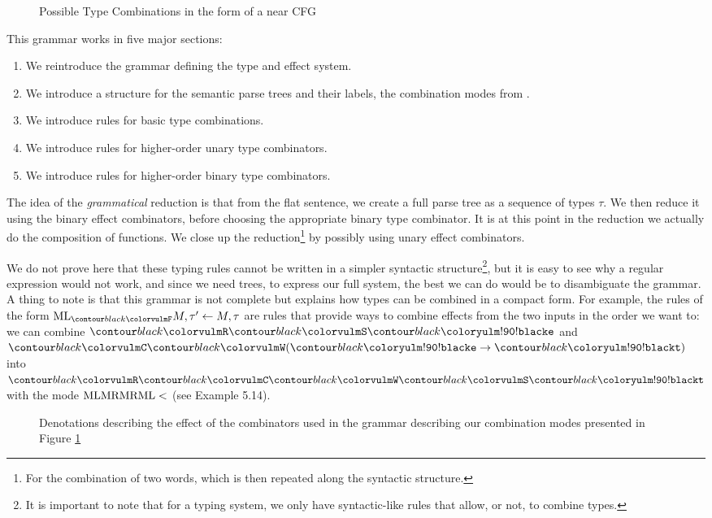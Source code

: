 \begin{figure}
	\centering
	\caption{Possible Type Combinations in the form of a near CFG}
	\label{fig:combination-cfg}
\end{figure}

This grammar works in five major sections:
\begin{enumerate}
	\item We reintroduce the grammar defining the type and effect system.
	\item We introduce a structure for the semantic parse trees and their labels,
	      the combination modes from
	      .
	\item We introduce rules for basic type combinations.
	\item We introduce rules for higher-order unary type combinators.
	\item We introduce rules for higher-order binary type combinators.
\end{enumerate}
The idea of the \emph{grammatical} reduction is that from the flat sentence,
we create a full parse tree as a sequence of types $\tau$.
We then reduce it using the binary effect combinators, before choosing the
appropriate binary type combinator.
It is at this point in the reduction we actually do the composition
of functions.
We close up the reduction\footnote{For the combination of two words, which is
	then repeated along the syntactic structure.} by possibly using unary effect
combinators.

\medskip

We do not prove here that these typing rules cannot be written in a simpler
syntactic structure\footnote{It is important to note that for a typing system,
	we only have syntactic-like rules that allow, or not, to combine types.}, but
it is easy to see why a regular expression would not work, and since we need
trees, to express our full system, the best we can do would be to disambiguate
the grammar.
A thing to note is that this grammar is not complete but explains how types can
be combined in a compact form.
For example, the rules of the form $\combML_{\f{F}} M, \tau' \gets M, \tau$ are
rules that provide ways to combine effects from the two inputs in the order we
want to: we can combine $\f{R}\f{S}\e$ and $\f{C}\f{W}(\e \to \t)$ into
$\f{R}\f{C}\f{W}\f{S}\t$ with the mode $\text{ML}\text{MR}\text{MR}\text{ML} <$ (see
\cite{bumfordEffectdrivenInterpretationFunctors2025} Example 5.14).

\begin{figure}
	\centering
	\caption{Denotations describing the effect of the combinators used in the
		grammar describing our combination modes presented in
		Figure \ref{fig:combination-cfg}}
	\label{fig:combinator-denotations}
\end{figure}

